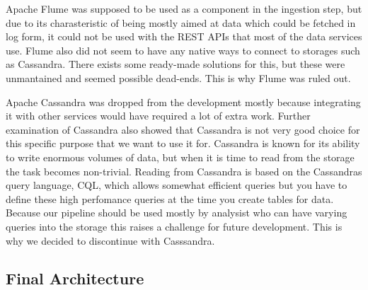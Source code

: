 Apache Flume was supposed to be used as a component in the ingestion step, but due to its charasteristic of being mostly aimed at data which could be fetched in log form, it could not be used with the REST APIs that most of the data services use.
Flume also did not seem to have any native ways to connect to storages such as Cassandra.
There exists some ready-made solutions for this, but these were unmantained and seemed possible dead-ends.
This is why Flume was ruled out.

Apache Cassandra was dropped from the development mostly because integrating it with other services would have required a lot of extra work. 
Further examination of Cassandra also showed that Cassandra is not very good choice for this specific purpose that we want to use it for.
Cassandra is known for its ability to write enormous volumes of data, but when it is time to read from the storage the task becomes non-trivial.
Reading from Cassandra is based on the Cassandras query language, CQL, which allows somewhat efficient queries but you have to define these high perfomance queries at the time you create tables for data. \cite{dronavalli}
Because our pipeline should be used mostly by analysist who can have varying queries into the storage this raises a challenge for future development.
This is why we decided to discontinue with Casssandra.

\subsection{Final Architecture}

